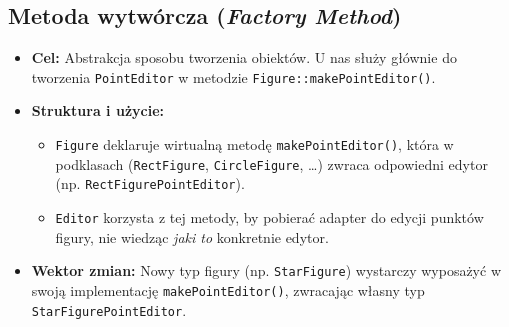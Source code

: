 \documentclass[a4paper,12pt]{article}
\begin{document}
\subsection{Metoda wytwórcza (\emph{Factory Method})}
\begin{itemize}
    \item \textbf{Cel:} Abstrakcja sposobu tworzenia obiektów. 
    U nas służy głównie do tworzenia \texttt{PointEditor} w metodzie 
    \texttt{Figure::makePointEditor()}.
    \item \textbf{Struktura i użycie:}
    \begin{itemize}
        \item \texttt{Figure} deklaruje wirtualną metodę \texttt{makePointEditor()}, 
        która w podklasach (\texttt{RectFigure}, \texttt{CircleFigure}, \dots) zwraca
        odpowiedni edytor (np. \texttt{RectFigurePointEditor}).
        \item \texttt{Editor} korzysta z tej metody, by pobierać adapter 
        do edycji punktów figury, nie wiedząc \emph{jaki to} konkretnie edytor.
    \end{itemize}
    \item \textbf{Wektor zmian:} Nowy typ figury (np. \texttt{StarFigure}) 
    wystarczy wyposażyć w swoją implementację \texttt{makePointEditor()}, 
    zwracając własny typ \texttt{StarFigurePointEditor}.
\end{itemize}
\end{document}
